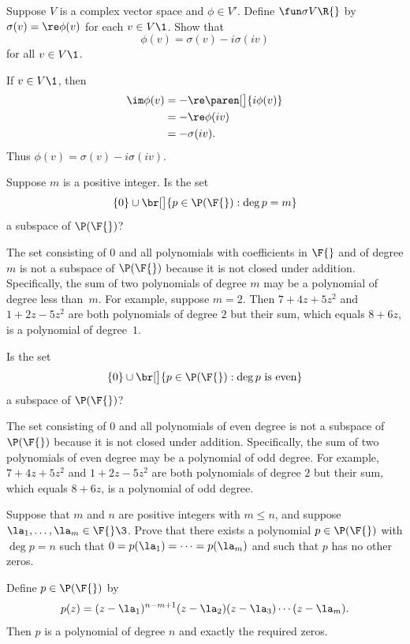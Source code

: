 \exercise
Suppose $V$ is a complex vector space and $\phi \in V'\!$. Define $\fun \sigma V {\R{}}$ by
$\sigma(v) = \re \phi(v)$ for each $v \in V\1$. Show that
\[
\phi(v) = \sigma(v) - i \sigma(iv)
\]
for all $v \in V\1$.

\begin{Solution}
If $v \in V\1$, then
\begin{align*}
\im \phi(v) &= - \re \paren[\big]{i\phi(v)}\\
&= - \re \phi(iv) \\
&= - \sigma(iv).
\end{align*}
Thus $\phi(v) = \sigma(v) - i \sigma(iv)$.
\end{Solution}

\exercise
Suppose $m$ is a positive integer.  Is the set
\[
\{0\} \cup \br[\big]{p \in \P(\F{}): \deg p = m}
\]
a subspace of $\P(\F{})$?

\begin{Solution}
The set consisting of $0$ and all
polynomials with coefficients in $\F{}$ and of degree $m$ is not a
subspace of $\P(\F{})$ because it is not closed under addition.  Specifically,
the sum of two polynomials of degree $m$ may be a polynomial of degree less
than~$m$.  For example, suppose $m = 2$.  Then $7 + 4z + 5z^2$ and
$1 + 2z - 5z^2$ are both polynomials of degree $2$ but their sum, which equals
$8 + 6z$, is a polynomial of degree~$1$.
\end{Solution}

\exercise
Is the set
\[
\{0\} \cup \br[\big]{p \in \P(\F{}): \deg p \text{ is even}}
\]
a subspace of $\P(\F{})$?

\begin{Solution}
The set consisting of $0$ and all polynomials of even degree is not a subspace of $\P(\F{})$ because it is not closed under addition.  Specifically, the sum of two polynomials of even degree may be a polynomial of odd degree.  For example, $7 + 4z + 5z^2$ and
$1 + 2z - 5z^2$ are both polynomials of degree $2$ but their sum, which equals $8 + 6z$, is a polynomial of odd degree.
\end{Solution}

\exercise
Suppose that $m$ and $n$ are positive integers with $m \le n$, and suppose $\la_1, \dots, \la_m \in \F{}\3$. Prove that there exists a polynomial $p \in \P(\F{})$ with $\deg p = n$ such that $0 = p(\la_1) = \dots = p(\la_m)$ and such that $p$ has no other zeros.

\begin{Solution}
Define $p \in \P(\F{})$ by
\[
p(z) = (z-\la_1)^{n-m+1} (z-\la_2) (z-\la_3) \dotsm (z-\la_m).
\]
Then $p$ is a polynomial of degree $n$ and exactly the required zeros.
\end{Solution}

